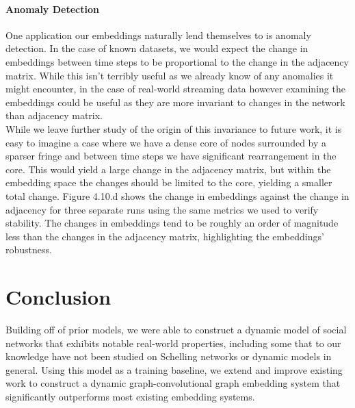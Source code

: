 \documentclass[12pt,twoside]{report}
\begin{document}
\subsubsection{Anomaly Detection}

One application our embeddings naturally lend themselves to is anomaly detection. In the case of known datasets, we would expect the change in embeddings between time steps to be proportional to the change in the adjacency matrix. While this isn't terribly useful as we already know of any anomalies it might encounter, in the case of real-world streaming data however examining the embeddings could be useful as they are more invariant to changes in the network than adjacency matrix. \\

While we leave further study of the origin of this invariance to future work, it is easy to imagine a case where we have a dense core of nodes surrounded by a sparser fringe and between time steps we have significant rearrangement in the core. This would yield a large change in the adjacency matrix, but within the embedding space the changes should be limited to the core, yielding a smaller total change. Figure 4.10.d shows the change in embeddings against the change in adjacency for three separate runs using the same metrics we used to verify stability. The changes in embeddings tend to be roughly an order of magnitude less than the changes in the adjacency matrix, highlighting the embeddings' robustness.  \\



\chapter{Conclusion}

Building off of prior models, we were able to construct a dynamic model of social networks that exhibits notable real-world properties, including some that to our knowledge have not been studied on Schelling networks or dynamic models in general. Using this model as a training baseline, we extend and improve existing work to construct a dynamic graph-convolutional graph embedding system that significantly outperforms most existing embedding systems. \\
\end{document}
